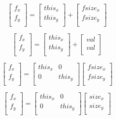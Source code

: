 \documentclass{article}
\begin{document}
\[ \left[ \begin{array}{c} f_x \\ f_y \\ \end{array} \right] = \left[ \begin{array}{c} this_x \\ this_y \\ \end{array} \right] + \left[ \begin{array}{c} fsize_x \\ fsize_y \\ \end{array} \right] \]
\pagebreak

\[ \left[ \begin{array}{c} f_x \\ f_y \\ \end{array} \right] = \left[ \begin{array}{c} this_x \\ this_y \\ \end{array} \right] + \left[ \begin{array}{c} val \\ val \\ \end{array} \right] \]
\pagebreak

\[ \left[ \begin{array}{c} f_x \\ f_y \\ \end{array} \right] = \left[ \begin{array}{cc} this_x & 0 \\ 0 & this_y \\ \end{array} \right] \left[ \begin{array}{c} fsize_x \\ fsize_y \\ \end{array} \right] \]
\pagebreak

\[ \left[ \begin{array}{c} f_x \\ f_y \\ \end{array} \right] = \left[ \begin{array}{cc} this_x & 0 \\ 0 & this_y \\ \end{array} \right] \left[ \begin{array}{c} size_x \\ size_y \\ \end{array} \right] \]
\pagebreak
\end{document}

